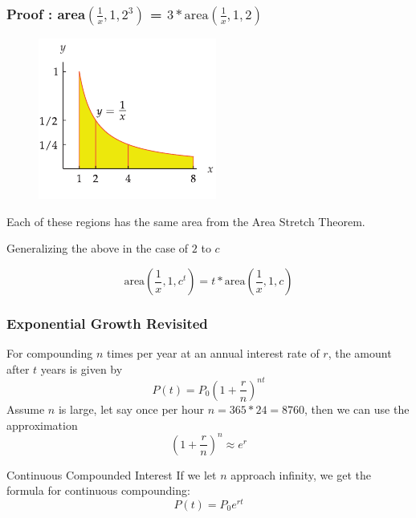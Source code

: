 \documentclass{beamer}
\begin{document}
\begin{frame}
  \frametitle{Proof : area\( \left( \frac{1}{x}, 1, 2^{3} \right) \) = \(3*\text{area}(\frac{1}{x}, 1, 2)\)}
  \begin{figure}
    \centering 
    \includegraphics[scale=0.4]{e_9.png}
  \end{figure}
  Each of these regions has the same area from the Area Stretch Theorem. 

  Generalizing the above in the case of \(2\) to \( c \)  

  \[ \text{area}\left(\frac{1}{x}, 1, c^{t}\right) = t*\text{area}\left(\frac{1}{x}, 1, c\right) \]

\end{frame}

\begin{frame}
  \frametitle{Exponential Growth Revisited}
  For compounding \(n\) times per year at an annual interest rate of \(r\), the amount after \(t\) years is given by
  \[
    P(t) = P_{0}\left(1+\frac{r}{n}\right)^{nt}
  \]
  Assume \(n\) is large, let say once per hour \(n= 365*24 = 8760\), then we can use the approximation 
  \[
    \left(1+\frac{r}{n}\right)^{n} \approx e^{r} 
  \]
  \begin{block}{Continuous Compounded Interest}
    If we let \(n\) approach infinity, we get the formula for continuous compounding:
    \[
      P(t) = P_{0}e^{rt}
    \]
  \end{block}
\end{frame}
\end{document}
